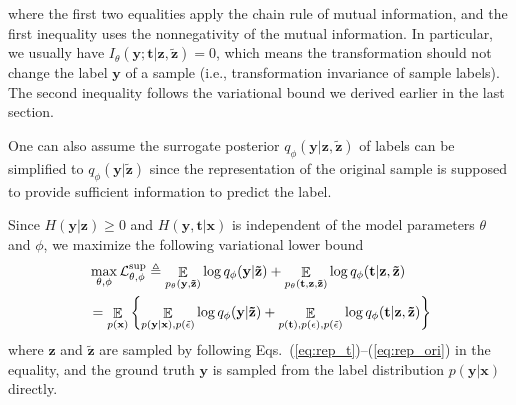 \documentclass[10pt,journal,compsoc,twoside]{IEEEtran}
\begin{document}
where the first two equalities apply the chain rule of mutual information, and the first inequality uses the nonnegativity of the mutual information. In particular, we usually have $I_\theta(\mathbf y;\mathbf t|\mathbf z,\mathbf{\tilde z})=0$, which means the transformation should not change the label $\mathbf y$ of a sample (i.e., transformation invariance of sample labels). The second inequality follows the variational bound we derived earlier in the last section.

One can also assume the surrogate posterior $q_\phi(\mathbf y|\mathbf z,\mathbf {\tilde z})$ of labels can be simplified to $q_\phi(\mathbf y|\mathbf {\tilde z})$ since the representation of the original sample is supposed to provide sufficient information to predict the label.

Since $H(\mathbf y|\mathbf z)\geq 0$ and $H(\mathbf y,\mathbf t|\mathbf x)$ is independent of the model parameters $\theta$ and $\phi$, we maximize the following variational lower bound
\begin{equation}\label{eq:lb}
\begin{aligned}
&\max\limits_{\theta,\phi}
\mathcal L^{\rm sup}_{\theta,\phi}\triangleq
 \mathop\mathbb E\limits_{p_\theta(\mathbf y,\mathbf {\tilde z})} \log q_\phi(\mathbf y|\mathbf {\tilde z})+\mathop\mathbb E\limits_{p_\theta(\mathbf t,\mathbf z,\mathbf {\tilde z})} \log q_\phi(\mathbf t|\mathbf z,\mathbf {\tilde z})\\
 &=\mathop\mathbb E\limits_{p(\mathbf x)}\left\{\mathop\mathbb E\limits_{p(\mathbf y|\mathbf x),p(\tilde\epsilon)} \log q_\phi(\mathbf y|\mathbf {\tilde z})+\mathop\mathbb E\limits_{p(\mathbf t),p(\epsilon),p(\tilde\epsilon)} \log q_\phi(\mathbf t|\mathbf z, \mathbf {\tilde z})\right\}
\end{aligned}
\end{equation}
where $\mathbf z$ and $\mathbf {\tilde z}$ are sampled by following Eqs.~(\ref{eq:rep_t})--(\ref{eq:rep_ori}) in the equality, and the ground truth $\mathbf y$ is sampled from the label distribution $p(\mathbf y|\mathbf x)$ directly.
\end{document}
